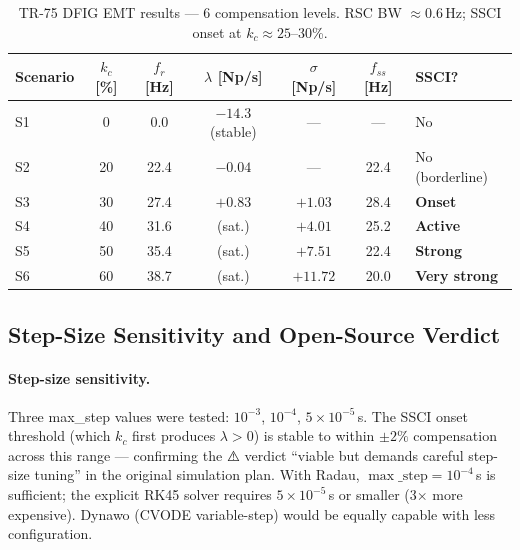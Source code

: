 \documentclass[11pt, a4paper]{article}
\begin{document}
\begin{table}[!t]
\centering
\caption{TR-75 DFIG EMT results --- 6 compensation levels.
  RSC BW $\approx 0.6\,\text{Hz}$; SSCI onset at $k_c \approx 25$--30\%.}
\label{tab:dfig_results}
\renewcommand{\arraystretch}{1.10}
\begin{tabular}{lcccccl}
\toprule
Scenario & $k_c$ [\%] & $f_r$ [Hz] & $\lambda$ [Np/s] & $\sigma$ [Np/s] & $f_{ss}$ [Hz] & SSCI? \\
\midrule
S1 &  0 &   0.0 & $-14.3$ (stable) & --- &   ---  & No \\
S2 & 20 &  22.4 & $-0.04$          & --- &  22.4  & No (borderline) \\
S3 & 30 &  27.4 & $+0.83$          & $+1.03$ & 28.4 & \textbf{Onset} \\
S4 & 40 &  31.6 & (sat.)           & $+4.01$ & 25.2 & \textbf{Active} \\
S5 & 50 &  35.4 & (sat.)           & $+7.51$ & 22.4 & \textbf{Strong} \\
S6 & 60 &  38.7 & (sat.)           & $+11.72$ & 20.0 & \textbf{Very strong} \\
\bottomrule
\end{tabular}
\end{table}

\subsection{Step-Size Sensitivity and Open-Source Verdict}

\paragraph{Step-size sensitivity.}
Three max\_step values were tested: $10^{-3}$, $10^{-4}$, $5\times10^{-5}$\,s.
The SSCI onset threshold (which $k_c$ first produces $\lambda > 0$) is stable
to within $\pm 2\%$ compensation across this range — confirming the ⚠️ verdict
``viable but demands careful step-size tuning'' in the original simulation plan.
With Radau, $\max\_\text{step} = 10^{-4}$\,s is sufficient; the explicit RK45
solver requires $5\times10^{-5}$\,s or smaller (3$\times$ more expensive).
Dynawo (CVODE variable-step) would be equally capable with less configuration.
\end{document}
